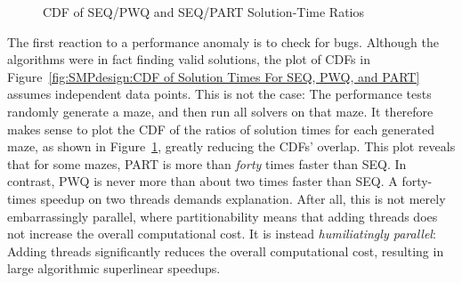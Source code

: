 \begin{figure}[tb]
\begin{center}
\end{center}
\caption{CDF of SEQ/PWQ and SEQ/PART Solution-Time Ratios}
\label{fig:SMPdesign:CDF of SEQ/PWQ and SEQ/PART Solution-Time Ratios}
\end{figure}

The first reaction to a performance anomaly is to check for bugs.
Although the algorithms were in fact finding valid solutions, the
plot of CDFs in
Figure~\ref{fig:SMPdesign:CDF of Solution Times For SEQ, PWQ, and PART}
assumes independent data points.
This is not the case:  The performance tests randomly generate a maze,
and then run all solvers on that maze.
It therefore makes sense to plot the CDF of the ratios of
solution times for each generated maze,
as shown in
Figure~\ref{fig:SMPdesign:CDF of SEQ/PWQ and SEQ/PART Solution-Time Ratios},
greatly reducing the CDFs' overlap.
This plot reveals that for some mazes, PART
is more than \emph{forty} times faster than SEQ.
In contrast, PWQ is never more than about
two times faster than SEQ.
A forty-times speedup on two threads demands explanation.
After all, this is not merely embarrassingly parallel, where partitionability
means that adding threads does not increase the overall computational cost.
It is instead \emph{humiliatingly parallel}: Adding threads
significantly reduces the overall computational cost, resulting in
large algorithmic superlinear speedups.

